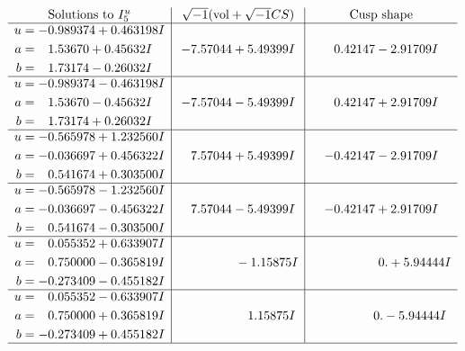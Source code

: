 \documentclass[1p]{elsarticle_modified}
\theoremstyle{definition}
\newcommand{\I}{\sqrt{-1}}
\begin{document}
$$\begin{array}{c|c|c}  
\text{Solutions to }I^u_{5}& \I (\text{vol} + \sqrt{-1}CS) & \text{Cusp shape}\\
 \hline 
\begin{aligned}
u &= -0.989374 + 0.463198 I \\
a &= \phantom{-}1.53670 + 0.45632 I \\
b &= \phantom{-}1.73174 - 0.26032 I\end{aligned}
 & -7.57044 + 5.49399 I & \phantom{-}0.42147 - 2.91709 I \\ \hline\begin{aligned}
u &= -0.989374 - 0.463198 I \\
a &= \phantom{-}1.53670 - 0.45632 I \\
b &= \phantom{-}1.73174 + 0.26032 I\end{aligned}
 & -7.57044 - 5.49399 I & \phantom{-}0.42147 + 2.91709 I \\ \hline\begin{aligned}
u &= -0.565978 + 1.232560 I \\
a &= -0.036697 + 0.456322 I \\
b &= \phantom{-}0.541674 + 0.303500 I\end{aligned}
 & \phantom{-}7.57044 + 5.49399 I & -0.42147 - 2.91709 I \\ \hline\begin{aligned}
u &= -0.565978 - 1.232560 I \\
a &= -0.036697 - 0.456322 I \\
b &= \phantom{-}0.541674 - 0.303500 I\end{aligned}
 & \phantom{-}7.57044 - 5.49399 I & -0.42147 + 2.91709 I \\ \hline\begin{aligned}
u &= \phantom{-}0.055352 + 0.633907 I \\
a &= \phantom{-}0.750000 - 0.365819 I \\
b &= -0.273409 - 0.455182 I\end{aligned}
 & \phantom{-0.000000 } -1.15875 I & \phantom{-0.000000 -}0. + 5.94444 I \\ \hline\begin{aligned}
u &= \phantom{-}0.055352 - 0.633907 I \\
a &= \phantom{-}0.750000 + 0.365819 I \\
b &= -0.273409 + 0.455182 I\end{aligned}
 & \phantom{-0.000000 -}1.15875 I & \phantom{-0.000000 } 0. - 5.94444 I\\
 \hline 
 \end{array}$$\newpage\newpage\renewcommand{\arraystretch}{1}
\end{document}
